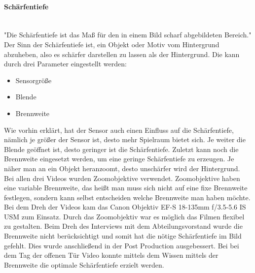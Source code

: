 \paragraph{Schärfentiefe}
\leavevmode \\
"Die Schärfentiefe ist das Maß für den in einem Bild scharf abgebildeten Bereich." Der Sinn der Schärfentiefe ist, ein Objekt oder Motiv vom Hintergrund abzuheben, also es schärfer darstellen zu lassen als der Hintergrund.\newline
Die kann durch drei Parameter eingestellt werden:
\begin{itemize}
	\item Sensorgröße
	\item Blende
	\item Brennweite
\end{itemize}
Wie vorhin erklärt, hat der Sensor auch einen Einfluss auf die Schärfentiefe, nämlich je größer der Sensor ist, desto mehr Spielraum bietet sich.\newline
Je weiter die Blende geöffnet ist, desto geringer ist die Schärfentiefe. Zuletzt kann noch die Brennweite eingesetzt werden, um eine geringe Schärfentiefe zu erzeugen. Je näher man an ein Objekt heranzoomt, desto unschärfer wird der Hintergrund. \\ 
Bei allen drei Videos wurden Zoomobjektive verwendet. Zoomobjektive haben eine variable Brennweite, das heißt man muss sich nicht auf eine fixe Brennweite festlegen, sondern kann selbst entscheiden welche Brennweite man haben möchte. Bei dem Dreh der Videos kam das Canon Objektiv EF-S 18-135mm f/3.5-5.6 IS USM zum Einsatz. Durch das Zoomobjektiv war es möglich das Filmen flexibel zu gestalten. Beim Dreh des Interviews mit dem Abteilungsvorstand wurde die Brennweite nicht berücksichtigt und somit hat die nötige Schärfentiefe im Bild gefehlt. Dies wurde anschließend in der Post Production ausgebessert. Bei bei dem Tag der offenen Tür Video konnte mittels dem Wissen mittels der Brennweite die optimale Schärfentiefe erzielt werden.